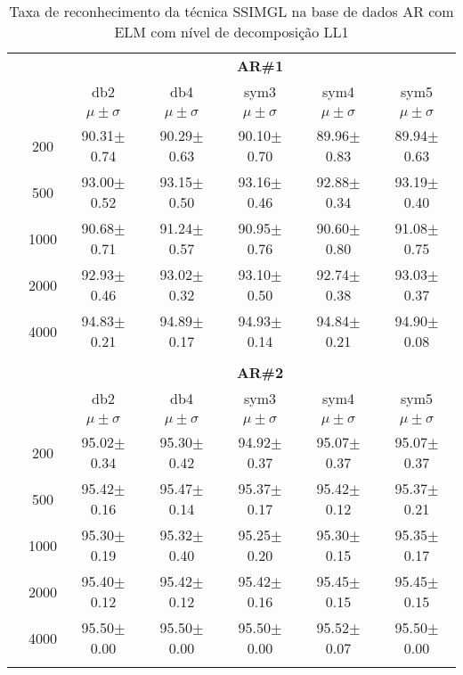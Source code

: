 


\begin{table}[H]
	\centering
    \normalsize
	\caption{Taxa de reconhecimento da técnica SSIMGL na base de dados AR com ELM com nível de decomposição LL1}
		\begin{tabular}{|c|c|c c c c c|}
\cline{3-7}
\multicolumn{2}{c|}{\multirow{3}{*}{}} & \multicolumn{5}{c|}{\textbf{AR\#1}}   \\\cline{3-7} 
\multicolumn{2}{c|}{}  & db2 & db4 & sym3 & sym4 & sym5 \\\cline{3-7}%
\multicolumn{2}{c|}{}& $\mu \pm \sigma$ & $\mu \pm \sigma$ & $\mu \pm \sigma$ & $\mu \pm \sigma$ & $\mu \pm \sigma$ \\\hline


\multicolumn{1}{|c|}{ \multirow{5}{*}{\rotatebox[origin=c]{90}{\textbf{Neurônios}}} }
&200	&90.31$\pm$0.74	&90.29$\pm$0.63	&90.10$\pm$0.70	&89.96$\pm$0.83	&89.94$\pm$0.63	\\\cline{2-7}
&500	&93.00$\pm$0.52	&93.15$\pm$0.50	&93.16$\pm$0.46	&92.88$\pm$0.34	&93.19$\pm$0.40	\\\cline{2-7}
&1000	&90.68$\pm$0.71	&91.24$\pm$0.57	&90.95$\pm$0.76	&90.60$\pm$0.80	&91.08$\pm$0.75	\\\cline{2-7}
&2000	&92.93$\pm$0.46 &93.02$\pm$0.32	&93.10$\pm$0.50	&92.74$\pm$0.38	&93.03$\pm$0.37	\\\cline{2-7}
&4000	&94.83$\pm$0.21	&94.89$\pm$0.17	&94.93$\pm$0.14	&94.84$\pm$0.21	&94.90$\pm$0.08	

\\ \midrule
\multicolumn{7}{c}{}\\ 


\cline{3-7}
\multicolumn{2}{c|}{\multirow{3}{*}{}} & \multicolumn{5}{c|}{\textbf{AR\#2}}   \\\cline{3-7} 
\multicolumn{2}{c|}{}  & db2 & db4 & sym3 & sym4 & sym5 \\\cline{3-7}%
\multicolumn{2}{c|}{}& $\mu \pm \sigma$ & $\mu \pm \sigma$ & $\mu \pm \sigma$ & $\mu \pm \sigma$ & $\mu \pm \sigma$ \\\hline

\multicolumn{1}{|c|}{ \multirow{5}{*}{\rotatebox[origin=c]{90}{\textbf{Neurônios}}} }
&200	&95.02$\pm$0.34 &95.30$\pm$0.42	&94.92$\pm$0.37	&95.07$\pm$0.37	&95.07$\pm$0.37	\\\cline{2-7}
&500	&95.42$\pm$0.16	&95.47$\pm$0.14	&95.37$\pm$0.17	&95.42$\pm$0.12	&95.37$\pm$0.21	\\\cline{2-7}
&1000	&95.30$\pm$0.19 &95.32$\pm$0.40	&95.25$\pm$0.20	&95.30$\pm$0.15	&95.35$\pm$0.17	\\\cline{2-7}
&2000	&95.40$\pm$0.12	&95.42$\pm$0.12	&95.42$\pm$0.16	&95.45$\pm$0.15	&95.45$\pm$0.15	\\\cline{2-7}
&4000	&95.50$\pm$0.00	&95.50$\pm$0.00	&95.50$\pm$0.00	&95.52$\pm$0.07	&95.50$\pm$0.00	
 \\ \midrule
\multicolumn{7}{c}{}\\ 



\end{tabular}
\end{table}
